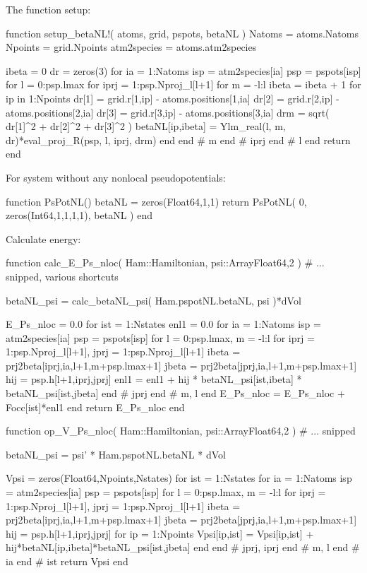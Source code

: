 The function setup:
\begin{juliacode}
function setup_betaNL!( atoms, grid, pspots, betaNL )
  Natoms = atoms.Natoms
  Npoints = grid.Npoints
  atm2species = atoms.atm2species

  ibeta = 0
  dr = zeros(3)
  for ia = 1:Natoms
    isp = atm2species[ia]
    psp = pspots[isp]
    for l = 0:psp.lmax
    for iprj = 1:psp.Nproj_l[l+1]
    for m = -l:l
      ibeta = ibeta + 1
      for ip in 1:Npoints
        dr[1] = grid.r[1,ip] - atoms.positions[1,ia]
        dr[2] = grid.r[2,ip] - atoms.positions[2,ia]
        dr[3] = grid.r[3,ip] - atoms.positions[3,ia]
        drm = sqrt( dr[1]^2 + dr[2]^2 + dr[3]^2 )
        betaNL[ip,ibeta] = Ylm_real(l, m, dr)*eval_proj_R(psp, l, iprj, drm)
      end
    end # m
    end # iprj
    end # l
  end
  return
end
\end{juliacode}

For system without any nonlocal pseudopotentials:
\begin{juliacode}
function PsPotNL()
  betaNL = zeros(Float64,1,1)
  return PsPotNL( 0, zeros(Int64,1,1,1,1), betaNL )
end
\end{juliacode}

Calculate energy:
\begin{juliacode}
function calc_E_Ps_nloc( Ham::Hamiltonian, psi::Array{Float64,2} )
  # ... snipped, various shortcuts

  betaNL_psi = calc_betaNL_psi( Ham.pspotNL.betaNL, psi )*dVol

  E_Ps_nloc = 0.0
  for ist = 1:Nstates
    enl1 = 0.0
    for ia = 1:Natoms
      isp = atm2species[ia]
      psp = pspots[isp]
      for l = 0:psp.lmax, m = -l:l
        for iprj = 1:psp.Nproj_l[l+1], jprj = 1:psp.Nproj_l[l+1]
          ibeta = prj2beta[iprj,ia,l+1,m+psp.lmax+1]
          jbeta = prj2beta[jprj,ia,l+1,m+psp.lmax+1]
          hij = psp.h[l+1,iprj,jprj]
          enl1 = enl1 + hij * betaNL_psi[ist,ibeta] * betaNL_psi[ist,jbeta]
        end # jprj
      end # m, l
    end
    E_Ps_nloc = E_Ps_nloc + Focc[ist]*enl1
  end
  return E_Ps_nloc
end
\end{juliacode}

\begin{juliacode}
function op_V_Ps_nloc( Ham::Hamiltonian, psi::Array{Float64,2} )
  # ... snipped

  betaNL_psi = psi' * Ham.pspotNL.betaNL * dVol
  
  Vpsi = zeros(Float64,Npoints,Nstates)
  for ist = 1:Nstates
    for ia = 1:Natoms
      isp = atm2species[ia]
      psp = pspots[isp]
      for l = 0:psp.lmax, m = -l:l
        for iprj = 1:psp.Nproj_l[l+1], jprj = 1:psp.Nproj_l[l+1]
          ibeta = prj2beta[iprj,ia,l+1,m+psp.lmax+1]
          jbeta = prj2beta[jprj,ia,l+1,m+psp.lmax+1]
          hij = psp.h[l+1,iprj,jprj]
          for ip = 1:Npoints
              Vpsi[ip,ist] = Vpsi[ip,ist] + hij*betaNL[ip,ibeta]*betaNL_psi[ist,jbeta]
          end
        end # jprj, iprj
      end # m, l
    end # ia
  end # ist
  return Vpsi
end
\end{juliacode}


